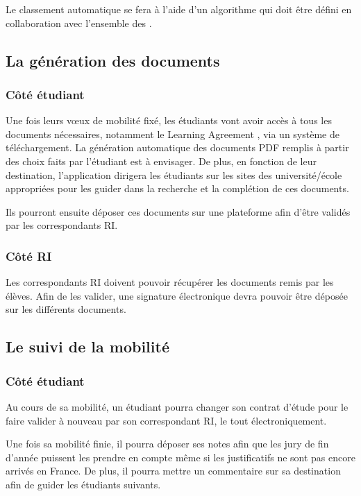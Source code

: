 		Le classement automatique se fera à l'aide d'un algorithme qui doit être défini en collaboration avec l'ensemble des \ris.		
		
		\subsection{La génération des documents}
		
		\subsubsection{Côté étudiant}
		
		Une fois leurs vœux de mobilité fixé, les étudiants vont avoir accès à tous les documents nécessaires, notamment le \og Learning Agreement \fg{}, via un système de téléchargement. La génération automatique des documents PDF remplis à partir des choix faits par l'étudiant est à envisager. De plus, en fonction de leur destination, l'application dirigera les étudiants sur les sites des université/école appropriées pour les guider dans la recherche et la complétion de ces documents.
		
		Ils pourront ensuite déposer ces documents sur une plateforme afin d'être validés par les correspondants RI.
	
		\subsubsection{Côté RI}
		
		Les correspondants RI doivent pouvoir récupérer les documents remis par les élèves. Afin de les valider, une signature électronique devra pouvoir être déposée sur les différents documents. 
		
		
		\subsection{Le suivi de la mobilité}
		
		\subsubsection{Côté étudiant}
		
		Au cours de sa mobilité, un étudiant pourra changer son contrat d'étude pour le faire valider à nouveau par son correspondant RI, le tout électroniquement.
		
		Une fois sa mobilité finie, il pourra déposer ses notes afin que les jury de fin d'année puissent les prendre en compte même si les justificatifs ne sont pas encore arrivés en France. De plus, il pourra mettre un commentaire sur sa destination afin de guider les étudiants suivants.
		
